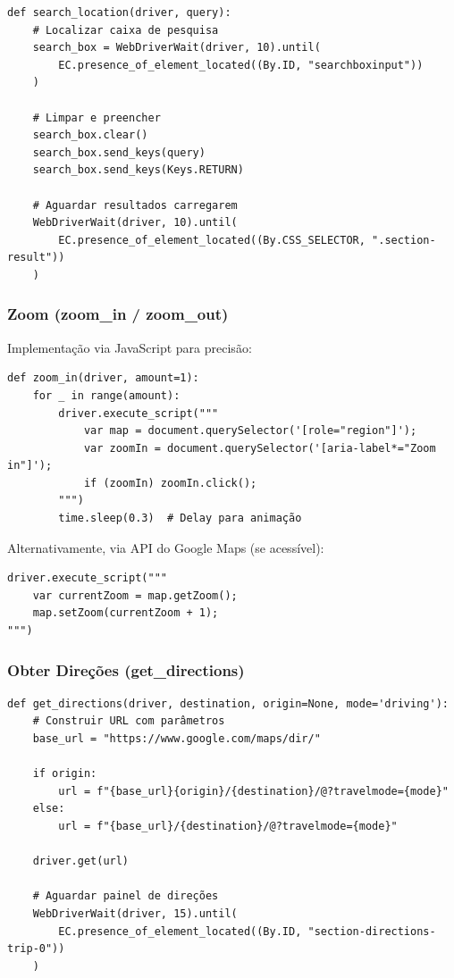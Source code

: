 \begin{verbatim}
def search_location(driver, query):
    # Localizar caixa de pesquisa
    search_box = WebDriverWait(driver, 10).until(
        EC.presence_of_element_located((By.ID, "searchboxinput"))
    )

    # Limpar e preencher
    search_box.clear()
    search_box.send_keys(query)
    search_box.send_keys(Keys.RETURN)

    # Aguardar resultados carregarem
    WebDriverWait(driver, 10).until(
        EC.presence_of_element_located((By.CSS_SELECTOR, ".section-result"))
    )
\end{verbatim}

\subsubsection{Zoom (zoom\_in / zoom\_out)}

Implementação via JavaScript para precisão:
\begin{verbatim}
def zoom_in(driver, amount=1):
    for _ in range(amount):
        driver.execute_script("""
            var map = document.querySelector('[role="region"]');
            var zoomIn = document.querySelector('[aria-label*="Zoom in"]');
            if (zoomIn) zoomIn.click();
        """)
        time.sleep(0.3)  # Delay para animação
\end{verbatim}

Alternativamente, via API do Google Maps (se acessível):
\begin{verbatim}
driver.execute_script("""
    var currentZoom = map.getZoom();
    map.setZoom(currentZoom + 1);
""")
\end{verbatim}

\subsubsection{Obter Direções (get\_directions)}

\begin{verbatim}
def get_directions(driver, destination, origin=None, mode='driving'):
    # Construir URL com parâmetros
    base_url = "https://www.google.com/maps/dir/"

    if origin:
        url = f"{base_url}{origin}/{destination}/@?travelmode={mode}"
    else:
        url = f"{base_url}/{destination}/@?travelmode={mode}"

    driver.get(url)

    # Aguardar painel de direções
    WebDriverWait(driver, 15).until(
        EC.presence_of_element_located((By.ID, "section-directions-trip-0"))
    )
\end{verbatim}

